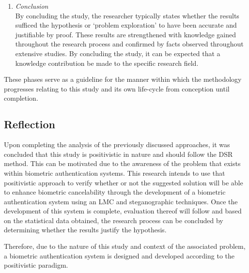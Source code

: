 \begin{enumerate}[label=\roman*.]
	\item \textit{Conclusion} \\
	By concluding the study, the researcher typically states whether the results sufficed the hypothesis or ‘problem exploration’ to have been accurate and justifiable by proof. These results are strengthened with knowledge gained throughout the research process and confirmed by facts observed throughout extensive studies. By concluding the study, it can be expected that a knowledge contribution be made to the specific research field.
\end{enumerate}

These phases serve as a guideline for the manner within which the methodology progresses relating to this study and its own life-cycle from conception until completion. 

\subsection{Reflection}
Upon completing the analysis of the previously discussed approaches, it was concluded that this study is positivistic in nature and should follow the DSR method. This can be motivated due to the awareness of the problem that exists within biometric authentication systems. This research intends to use that positivistic approach to verify whether or not the suggested solution will be able to enhance biometric cancelability through the development of a biometric authentication system using an LMC and steganographic techniques. Once the development of this system is complete, evaluation thereof will follow and based on the statistical data obtained, the research process can be concluded by determining whether the results justify the hypothesis.

Therefore, due to the nature of this study and context of the associated problem, a biometric authentication system is designed and developed according to the positivistic paradigm.

